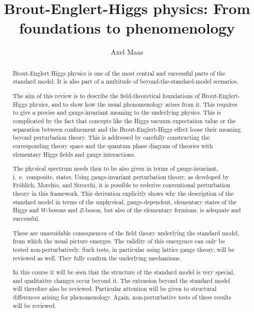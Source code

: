 \documentclass[final,12pt,3p,longtitle]{elsarticle}
\newcommand*{\1}{1\!\!\!\bot}
\begin{document}
\begin{frontmatter}
 
\title{Brout-Englert-Higgs physics: From foundations to phenomenology}%

\author{Axel Maas}

\address{Institute of Physics, NAWI Graz, University of Graz, Universit\"atsplatz 5, A-8010 Graz, Austria}

\begin{abstract}

Brout-Englert Higgs physics is one of the most central and successful parts of the standard model. It is also part of a multitude of beyond-the-standard-model scenarios.

The aim of this review is to describe the field-theoretical foundations of Brout-Englert-Higgs physics, and to show how the usual phenomenology arises from it. This requires to give a precise and gauge-invariant meaning to the underlying physics. This is complicated by the fact that concepts like the Higgs vacuum expectation value or the separation between confinement and the Brout-Englert-Higgs effect loose their meaning beyond perturbation theory. This is addressed by carefully constructing the corresponding theory space and the quantum phase diagram of theories with elementary Higgs fields and gauge interactions.

The physical spectrum needs then to be also given in terms of gauge-invariant, i.\ e.\ composite, states. Using gauge-invariant perturbation theory, as developed by Fr\"ohlich, Morchio, and Strocchi, it is possible to rederive conventional perturbation theory in this framework. This derivation explicitly shows why the description of the standard model in terms of the unphysical, gauge-dependent, elementary states of the Higgs and $W$-bosons and $Z$-boson, but also of the elementary fermions, is adequate and successful.

These are unavoidable consequences of the field theory underlying the standard model, from which the usual picture emerges. The validity of this emergence can only be tested non-perturbatively. Such tests, in particular using lattice gauge theory, will be reviewed as well. They fully confirm the underlying mechanisms.

In this course it will be seen that the structure of the standard model is very special, and qualitative changes occur beyond it. The extension beyond the standard model will therefore also be reviewed. Particular attention will be given to structural differences arising for phenomenology. Again, non-perturbative tests of these results will be reviewed.


\end{abstract}
\end{frontmatter}
\end{document}
